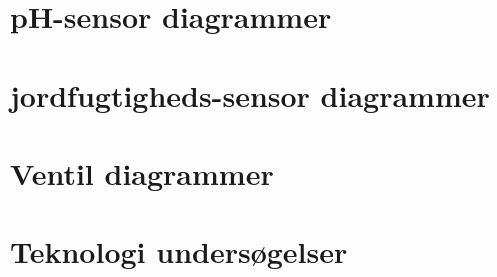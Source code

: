 \newpage

\section{pH-sensor diagrammer}



\newpage

\section{jordfugtigheds-sensor diagrammer}



\newpage

\section{Ventil diagrammer}



\newpage


\newpage

\section{Teknologi undersøgelser}

%